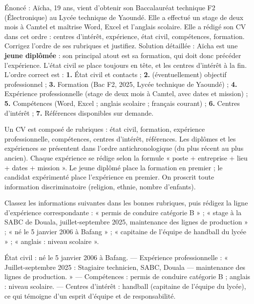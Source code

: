 \documentclass[11pt]{article}
\newcommand{\cle}[1]{{\popxbold\color{popdark}#1}}
\begin{document}
\begin{exoresolu}
Énoncé : Aïcha, 19 ans, vient d'obtenir son Baccalauréat technique F2 (Électronique) au Lycée technique de Yaoundé. Elle a effectué un stage de deux mois à Camtel et maîtrise Word, Excel et l'anglais scolaire. Elle a rédigé son CV dans cet ordre : centres d'intérêt, expérience, état civil, compétences, formation. Corrigez l'ordre de ses rubriques et justifiez.
\tcblower
Solution détaillée : Aïcha est une \textbf{jeune diplômée} : son principal atout est sa formation, qui doit donc précéder l'expérience. L'état civil se place toujours en tête, et les centres d'intérêt à la fin. L'ordre correct est : \textbf{1.} État civil et contacts ; \textbf{2.} (éventuellement) objectif professionnel ; \textbf{3.} Formation (Bac F2, 2025, Lycée technique de Yaoundé) ; \textbf{4.} Expérience professionnelle (stage de deux mois à Camtel, avec dates et mission) ; \textbf{5.} Compétences (Word, Excel ; anglais scolaire ; français courant) ; \textbf{6.} Centres d'intérêt ; \textbf{7.} Références disponibles sur demande.
\end{exoresolu}

\begin{aretenir}[L'essentiel]
Un CV est composé de \cle{rubriques} : état civil, formation, expérience professionnelle, compétences, centres d'intérêt, références. Les diplômes et les expériences se présentent dans l'\cle{ordre antichronologique} (du plus récent au plus ancien). Chaque expérience se rédige selon la formule « poste + entreprise + lieu + dates + mission ». Le jeune diplômé place la formation en premier ; le candidat expérimenté place l'expérience en premier. On proscrit toute information discriminatoire (religion, ethnie, nombre d'enfants).
\end{aretenir}

\begin{exercice}
Classez les informations suivantes dans les bonnes rubriques, puis rédigez la ligne d'expérience correspondante : « permis de conduire catégorie B » ; « stage à la SABC de Douala, juillet-septembre 2025, maintenance des lignes de production » ; « né le 5 janvier 2006 à Bafang » ; « capitaine de l'équipe de handball du lycée » ; « anglais : niveau scolaire ».
\end{exercice}

\begin{corrige}[Exercice]
État civil : né le 5 janvier 2006 à Bafang. — Expérience professionnelle : « Juillet-septembre 2025 : Stagiaire technicien, SABC, Douala — maintenance des lignes de production. » — Compétences : permis de conduire catégorie B ; anglais : niveau scolaire. — Centres d'intérêt : handball (capitaine de l'équipe du lycée), ce qui témoigne d'un esprit d'équipe et de responsabilité.
\end{corrige}
\end{document}
